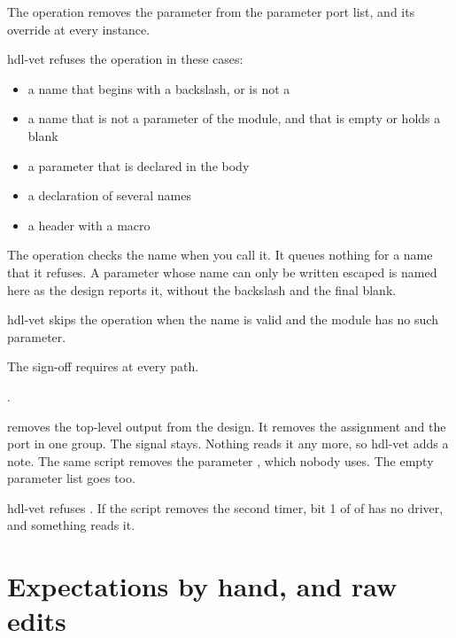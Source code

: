 \begin{entry}{}
\item[Writes] The operation removes the parameter from the parameter port list, and its
  override at every instance.
\item[Refused] hdl-vet refuses the operation in these cases:
  \begin{itemize}
  \item a name that begins with a backslash, or is not a 
  \item a name that is not a parameter of the module, and that is empty or holds a blank
  \item a parameter that is declared in the body
  \item a declaration of several names
  \item a header with a macro
  \end{itemize}
  The operation checks the name when you call it. It queues nothing for a name that it
  refuses. A parameter whose name can only be written escaped is named here as the design
  reports it, without the backslash and the final blank.
\item[Again] hdl-vet skips the operation when the name is valid and the module has no
  such parameter.
\item[Sign-off] The sign-off requires  at every path.
\item[Example] .
\end{entry}







 removes the top-level output  from the design.
It removes the assignment and the port in one group. The signal  stays.
Nothing reads it any more, so hdl-vet adds a note. The same script removes the parameter
, which nobody uses. The empty parameter list goes too.

hdl-vet refuses . If the script removes the second timer, bit 1 of
 of  has no driver, and something reads it.

\section{Expectations by hand, and raw edits}
\label{sec:byhand}

